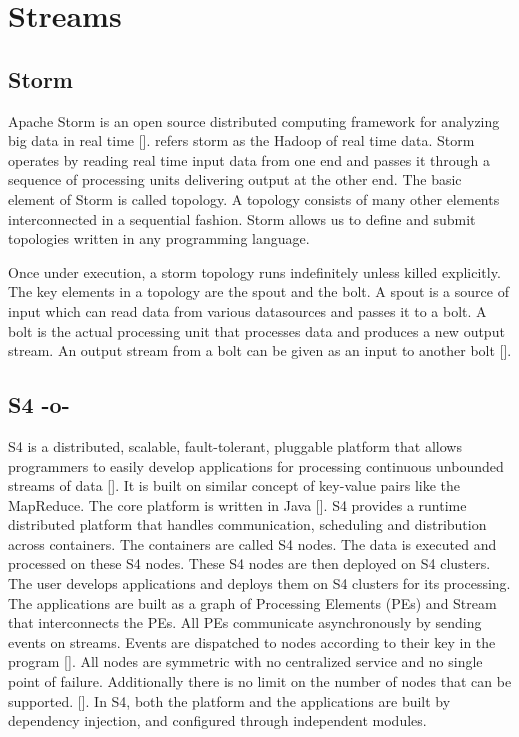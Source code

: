 \section{Streams}

\subsection{Storm}

Apache Storm is an open source distributed computing framework for
analyzing big data in real time [\cite{storm-paper-IJCTT}]. refers storm
as the Hadoop of real time data. Storm operates by reading real time
input data from one end and passes it through a sequence of processing
units delivering output at the other end. The basic element of Storm
is called topology. A topology consists of many other elements
interconnected in a sequential fashion. Storm allows us to define and
submit topologies written in any programming language.

Once under execution, a storm topology runs indefinitely unless killed
explicitly. The key elements in a topology are the spout and the
bolt. A spout is a source of input which can read data from various
datasources and passes it to a bolt. A bolt is the actual processing
unit that processes data and produces a new output stream. An output
stream from a bolt can be given as an input to another
bolt [\cite{www-storm-home-concepts}].
     
\subsection{S4 -o-}


S4 is a distributed, scalable, fault-tolerant, pluggable platform that
allows programmers to easily develop applications for processing
continuous unbounded streams of data [\cite{www-s4}]. It is built on
similar concept of key-value pairs like the MapReduce. The core
platform is written in Java [\cite{www-s4-overview}]. S4 provides a
runtime distributed platform that handles communication, scheduling
and distribution across containers. The containers are called S4
nodes. The data is executed and processed on these S4 nodes. These S4
nodes are then deployed on S4 clusters. The user develops applications
and deploys them on S4 clusters for its processing. The applications
are built as a graph of Processing Elements (PEs) and Stream that
interconnects the PEs. All PEs communicate asynchronously by sending
events on streams. Events are dispatched to nodes according to their
key in the program [\cite{www-s4}]. All nodes are symmetric with no
centralized service and no single point of failure. Additionally there
is no limit on the number of nodes that can be
supported. [\cite{www-wiki-s4}]. In S4, both the platform and the
applications are built by dependency injection, and configured through
independent modules.




